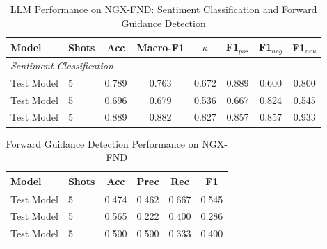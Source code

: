 
\begin{table}[h]
\centering
\caption{LLM Performance on NGX-FND: Sentiment Classification and Forward Guidance Detection}
\label{tab:main_results}
\setlength{\tabcolsep}{6pt}
\begin{tabular}{llcccccc}
\hline
\textbf{Model} & \textbf{Shots} & \textbf{Acc} & \textbf{Macro-F1} & \textbf{$\kappa$} & \textbf{F1$_{pos}$} & \textbf{F1$_{neg}$} & \textbf{F1$_{neu}$} \\
\hline
\multicolumn{8}{l}{\textit{Sentiment Classification}} \\
Test Model           & 5 & 0.789 & 0.763 & 0.672 & 0.889 & 0.600 & 0.800 \\
Test Model           & 5 & 0.696 & 0.679 & 0.536 & 0.667 & 0.824 & 0.545 \\
Test Model           & 5 & 0.889 & 0.882 & 0.827 & 0.857 & 0.857 & 0.933 \\
\hline
\end{tabular}
\end{table}



\begin{table}[h]
\centering
\caption{Forward Guidance Detection Performance on NGX-FND}
\label{tab:guidance_results}
\begin{tabular}{llcccc}
\hline
\textbf{Model} & \textbf{Shots} & \textbf{Acc} & \textbf{Prec} & \textbf{Rec} & \textbf{F1} \\
\hline
Test Model           & 5 & 0.474 & 0.462 & 0.667 & 0.545 \\
Test Model           & 5 & 0.565 & 0.222 & 0.400 & 0.286 \\
Test Model           & 5 & 0.500 & 0.500 & 0.333 & 0.400 \\
\hline
\end{tabular}
\end{table}